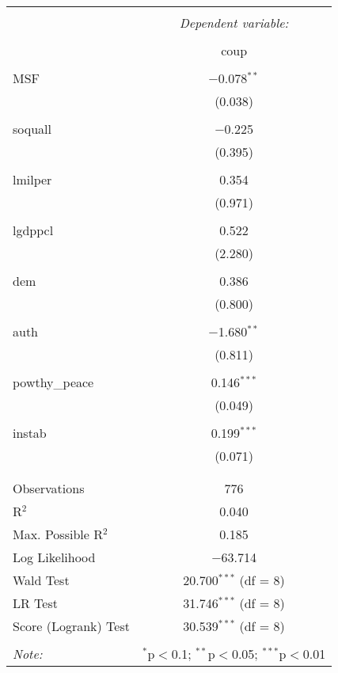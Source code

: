 
\begin{table}[!htbp] \centering 
  \caption{} 
  \label{} 
\begin{tabular}{@{\extracolsep{5pt}}lc} 
\\[-1.8ex]\hline 
\hline \\[-1.8ex] 
 & \multicolumn{1}{c}{\textit{Dependent variable:}} \\ 
\cline{2-2} 
\\[-1.8ex] & coup \\ 
\hline \\[-1.8ex] 
 MSF & $-$0.078$^{**}$ \\ 
  & (0.038) \\ 
  & \\ 
 soquall & $-$0.225 \\ 
  & (0.395) \\ 
  & \\ 
 lmilper & 0.354 \\ 
  & (0.971) \\ 
  & \\ 
 lgdppcl & 0.522 \\ 
  & (2.280) \\ 
  & \\ 
 dem & 0.386 \\ 
  & (0.800) \\ 
  & \\ 
 auth & $-$1.680$^{**}$ \\ 
  & (0.811) \\ 
  & \\ 
 powthy\_peace & 0.146$^{***}$ \\ 
  & (0.049) \\ 
  & \\ 
 instab & 0.199$^{***}$ \\ 
  & (0.071) \\ 
  & \\ 
\hline \\[-1.8ex] 
Observations & 776 \\ 
R$^{2}$ & 0.040 \\ 
Max. Possible R$^{2}$ & 0.185 \\ 
Log Likelihood & $-$63.714 \\ 
Wald Test & 20.700$^{***}$ (df = 8) \\ 
LR Test & 31.746$^{***}$ (df = 8) \\ 
Score (Logrank) Test & 30.539$^{***}$ (df = 8) \\ 
\hline 
\hline \\[-1.8ex] 
\textit{Note:}  & \multicolumn{1}{r}{$^{*}$p$<$0.1; $^{**}$p$<$0.05; $^{***}$p$<$0.01} \\ 
\end{tabular} 
\end{table} 
